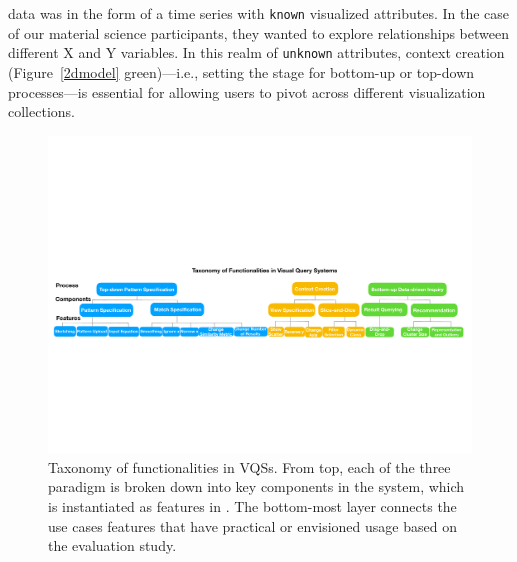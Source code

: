 data was in the form of a time series 
with \texttt{known} visualized attributes. 
In the case of our material science participants, 
they wanted to explore relationships between different 
X and Y variables. 
In this realm of \texttt{unknown} attributes, 
context creation (Figure~\ref{2dmodel} green)---i.e.,
setting the stage for bottom-up or top-down processes---is 
essential for allowing users 
to pivot across different visualization collections.%
\begin{figure}[ht!]
  \centering
  \includegraphics[width=\linewidth]{figures/full_taxonomy_wide.pdf}
  \caption{Taxonomy of functionalities in VQSs. From top, each of the three paradigm is broken down into key components in the system, which is instantiated as features in \zvpp. The bottom-most layer connects the use cases features that have practical or envisioned usage based on the evaluation study.}
  \label{fig:taxonomy}
\end{figure}
